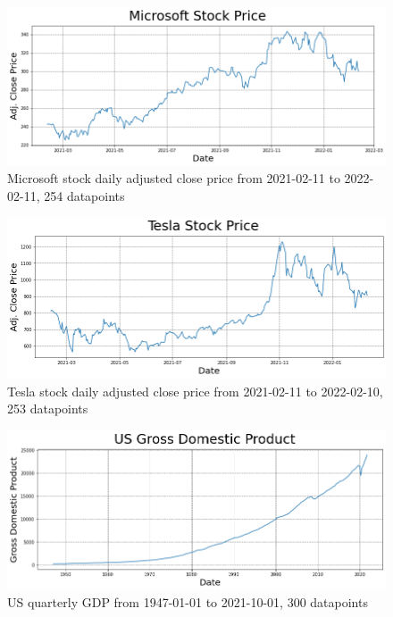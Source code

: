 \documentclass[conference]{IEEEtran}
\begin{document}
\begin{figure}
\begin{center}
\includegraphics[scale=0.50]{MSFT_time_series.png}
\caption{Microsoft stock daily adjusted close price from 2021-02-11 to 2022-02-11, 254 datapoints}
\label{fig:MSFT_time_series}
\end{center}
\end{figure}

\begin{figure}
\begin{center}
\includegraphics[scale=0.50]{TSLA_time_series.png}
\caption{Tesla stock daily adjusted close price from 2021-02-11 to 2022-02-10, 253 datapoints}
\label{fig:TSLA_time_series}
\end{center}
\end{figure}

\begin{figure}
\begin{center}
\includegraphics[scale=0.50]{GDP_time_series.png}
\caption{US quarterly GDP from 1947-01-01 to 2021-10-01, 300 datapoints}
\label{fig:GDP_time_series}
\end{center}
\end{figure}
\end{document}

